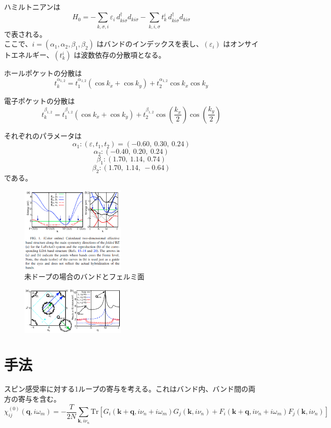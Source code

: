\documentclass[a4paper,12pt]{article}
\begin{document}
\begin{CJK}{UTF8}{min}
ハミルトニアンは
\[
H_0 = - \sum_{k, \sigma, i} \varepsilon_i \, d^{\dagger}_{ki\sigma} d_{ki\sigma} 
      - \sum_{k, i, \sigma} t^i_k \, d^{\dagger}_{ki\sigma} d_{ki\sigma}
\]
で表される。\\
ここで、\( i = (\alpha_1, \alpha_2, \beta_1, \beta_2 ) \) はバンドのインデックスを表し、\( (\varepsilon_i) \) はオンサイトエネルギー、\( (t^i_k) \) は波数依存の分散項となる。

ホールポケットの分散は
\[
t^{\alpha_{1,2}}_k = t^{\alpha_{1,2}}_1 (\cos k_x + \cos k_y) + t^{\alpha_{1,2}}_2 \cos k_x \cos k_y
\]

電子ポケットの分散は
\[
t^{\beta_{1,2}}_k = t^{\beta_{1,2}}_1 (\cos k_x + \cos k_y) 
+ t^{\beta_{1,2}}_2 \cos\left(\frac{k_x}{2}\right) \cos\left(\frac{k_y}{2}\right)
\]

それぞれのパラメータは
\[
\alpha_1 : (\varepsilon, t_1, t_2) = (-0.60,\ 0.30,\ 0.24)
\]
\[
\alpha_2 : (-0.40,\ 0.20,\ 0.24)
\]
\[
\beta_1  : (1.70,\ 1.14,\ 0.74)
\]
\[
\beta_2  : (1.70,\ 1.14,\ -0.64)
\]
である。

\begin{figure}[h]
    \centering
    \includegraphics[width=0.45\textwidth]{image-14.eps}
    \caption*{未ドープの場合のバンドとフェルミ面}
\end{figure}

\begin{figure}[h]
    \centering
    \includegraphics[width=0.45\textwidth]{image-15.eps}
    \caption*{}
\end{figure}

\section*{手法}
スピン感受率に対する1ループの寄与を考える。これはバンド内、バンド間の両方の寄与を含む。
\[
\chi^{(0)}_{ij}(\mathbf{q}, i\omega_m) = -\frac{T}{2N} \sum_{\mathbf{k}, i\nu_n} 
\mathrm{Tr} \left[
G_i(\mathbf{k} + \mathbf{q}, i\nu_n + i\omega_m) G_j(\mathbf{k}, i\nu_n) 
+ F_i(\mathbf{k} + \mathbf{q}, i\nu_n + i\omega_m) F_j(\mathbf{k}, i\nu_n)
\right]
\]


\end{CJK}
\end{document}
